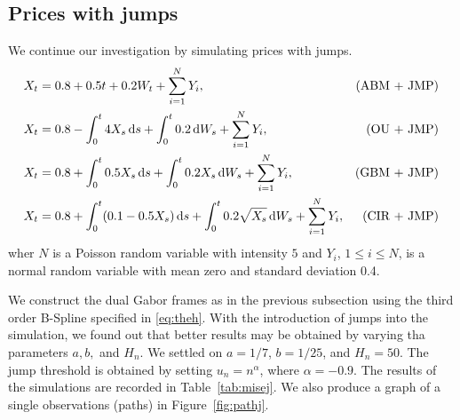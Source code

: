  \subsection{Prices with jumps}
We continue our investigation by simulating prices with jumps.    
\begin{align}
  & X_t = 0.8 +  0.5  t + 0.2  W_t + \sum_{i = 1}^N Y_i,\notag & \text{(ABM + JMP)}\\
  & X_t = 0.8 -\int_0^t 4 X_s \D s + \int^t_0 0.2 \D W_s +  \sum_{i = 1}^N Y_i ,\notag & \text{(OU + JMP)}\\
  & X_t = 0.8 + \int_0^t 0.5 X_s \D s + \int^t_0 0.2 X_s \D W_s + \sum_{i = 1}^N Y_i,\notag & \text{(GBM + JMP)}\\
  & X_t = 0.8 + \int_0^t(0.1 - 0.5 X_s) \D s +\int^t_0  0.2 \sqrt{X_s} \D W_s + \sum_{i = 1}^N Y_i,\notag & \text{(CIR + JMP)}
  \label{}
\end{align}
wher $N$ is a Poisson random variable with intensity $5$ and $Y_i$, $1 \le  i\le N$, is a normal random variable with mean zero and standard deviation 0.4.  

We construct the dual  Gabor frames as in the previous subsection using the  third order B-Spline specified in \eqref{eq:theh}. With the introduction of jumps into the simulation, we found out that better results may be obtained by varying tha parameters $a,b,$ and $H_n$. We settled on $a = 1/7$, $b = 1/25$, and $H_n = 50$. The jump threshold is obtained by setting $u_n = n^{\alpha}$, where $\alpha = -0.9$. The results of the simulations are recorded in Table~\ref{tab:misej}. We also produce a graph of a single observations (paths) in Figure~\ref{fig:pathj}. %


